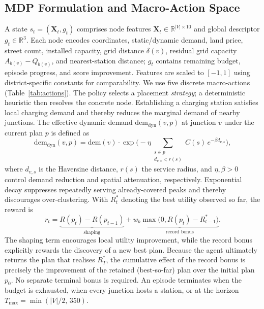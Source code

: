 \documentclass[graybox]{svmult}
\begin{document}
\subsection{MDP Formulation and Macro-Action Space}
\label{subsec:mdp}
A state $s_t=(\mathbf{X}_t,g_t)$ comprises node features $\mathbf{X}_t\in\mathbb{R}^{|V|\times10}$ and global descriptor $g_t\in\mathbb{R}^3$. Each node encodes coordinates, static/dynamic demand, land price, street count, installed capacity, grid distance $\delta(v)$, residual grid capacity $A_{b(v)}-Q_{b(v)}$, and nearest-station distance; $g_t$ contains remaining budget, episode progress, and score improvement. Features are scaled to $[-1,1]$ using district-specific constants for comparability.
 We use five discrete macro-actions (Table~\ref{tab:actions}). The policy selects a placement \emph{strategy}; a deterministic heuristic then resolves the concrete node.
Establishing a charging station satisfies local charging demand and thereby reduces the marginal demand of nearby junctions. The effective dynamic demand $\mathrm{dem}_{\mathrm{dyn}}(v,p)$ at junction $v$ under the current plan $p$ is defined as
\begin{equation}
\label{eq:dyndem}
\mathrm{dem}_{\mathrm{dyn}}(v,p)=\mathrm{dem}(v)\cdot
\exp\Biggl(-\eta\!\!\sum_{\substack{s\in p\\ d_{v,s}<r(s)}}\!\! C(s)\,e^{-\beta d_{v,s}}\Biggr),
\end{equation}
where $d_{v,s}$ is the Haversine distance, $r(s)$ the service radius, and $\eta,\beta>0$ control demand reduction and spatial attenuation, respectively. Exponential decay suppresses repeatedly serving already-covered peaks and thereby discourages over-clustering.
With $R^{*}_{t}$ denoting the best utility observed so far, the reward is
\begin{equation}
\label{eq:reward}
r_t=
\underbrace{R(p_t)-R(p_{t-1})}_{\text{shaping}}
+
w_b\underbrace{\max\bigl(0,R(p_t)-R^{*}_{t-1}\bigr)}_{\text{record bonus}}.
\end{equation}
The shaping term encourages local utility improvement, while the record bonus explicitly rewards the discovery of a new best plan. Because the agent ultimately returns the plan that realises \(R^{*}_{T}\), the cumulative effect of the record bonus is precisely the improvement of the retained (best-so-far) plan over the initial plan \(p_0\). No separate terminal bonus is required.
 An episode terminates when the budget is exhausted, when every junction hosts a station, or at the horizon $T_{\max}=\min(|V|/2,\,350)$.
\end{document}
